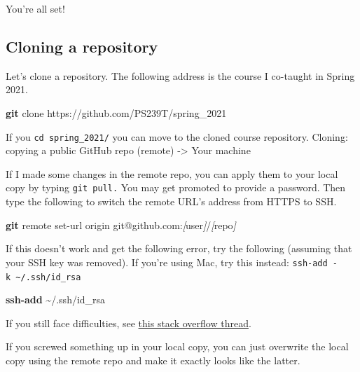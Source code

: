 \documentclass[
]{book}
\newenvironment{Shaded}{\begin{snugshade}}{\end{snugshade}}
\newcommand{\FunctionTok}[1]{\textcolor[rgb]{0.13,0.29,0.53}{\textbf{#1}}}
\newcommand{\NormalTok}[1]{#1}
\newcommand{\PreprocessorTok}[1]{\textcolor[rgb]{0.56,0.35,0.01}{\textit{#1}}}
\newcommand{\SpecialStringTok}[1]{\textcolor[rgb]{0.31,0.60,0.02}{#1}}
\begin{document}
You're all set!

\subsection{Cloning a repository}\label{cloning-a-repository}

Let's clone a repository. The following address is the course I co-taught in Spring 2021.

\begin{Shaded}
\begin{Highlighting}[]
\FunctionTok{git}\NormalTok{ clone https://github.com/PS239T/spring\_2021}
\end{Highlighting}
\end{Shaded}

If you \texttt{cd\ spring\_2021/} you can move to the cloned course repository. Cloning: copying a public GitHub repo (remote) -\textgreater{} Your machine

If I made some changes in the remote repo, you can apply them to your local copy by typing \texttt{git\ pull.} You may get promoted to provide a password. Then type the following to switch the remote URL's address from HTTPS to SSH.

\begin{Shaded}
\begin{Highlighting}[]
\FunctionTok{git}\NormalTok{ remote set{-}url origin git@github.com:}\PreprocessorTok{[}\SpecialStringTok{user}\PreprocessorTok{]}\NormalTok{/}\PreprocessorTok{[}\SpecialStringTok{repo}\PreprocessorTok{]}
\end{Highlighting}
\end{Shaded}

If this doesn't work and get the following error, try the following (assuming that your SSH key was removed). If you're using Mac, try this instead: \texttt{ssh-add\ -k\ \textasciitilde{}/.ssh/id\_rsa}

\begin{Shaded}
\begin{Highlighting}[]
\FunctionTok{ssh{-}add}\NormalTok{ \textasciitilde{}/.ssh/id\_rsa}
\end{Highlighting}
\end{Shaded}

If you still face difficulties, see \href{https://stackoverflow.com/questions/13509293/git-fatal-could-not-read-from-remote-repository}{this stack overflow thread}.

If you screwed something up in your local copy, you can just overwrite the local copy using the remote repo and make it exactly looks like the latter.
\end{document}
